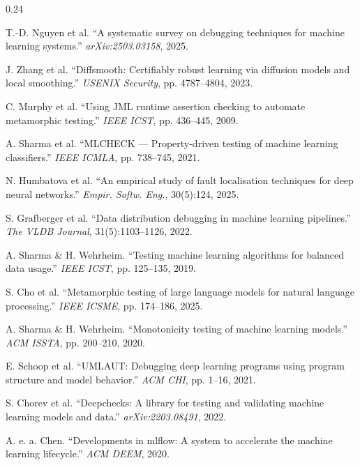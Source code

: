 \documentclass[final,t]{beamer}
\begin{document}
\begin{frame}[fragile]
\begin{columns}[T]
\begin{column}{0.24\textwidth}
\begin{posterblock}[References]
  \fontsize{15}{17.5}\selectfont\color{BodyText}
  \begin{enumerate}[leftmargin=8mm, itemsep=0.5mm, label={[\arabic*]}]
    \item T.-D. Nguyen et al. ``A systematic survey on debugging techniques for machine learning systems.'' \textit{arXiv:2503.03158}, 2025.
    \item J. Zhang et al. ``Diffsmooth: Certifiably robust learning via diffusion models and local smoothing.'' \textit{USENIX Security}, pp. 4787--4804, 2023.
    \item C. Murphy et al. ``Using JML runtime assertion checking to automate metamorphic testing.'' \textit{IEEE ICST}, pp. 436--445, 2009.
    \item A. Sharma et al. ``MLCHECK --- Property-driven testing of machine learning classifiers.'' \textit{IEEE ICMLA}, pp. 738--745, 2021.
    \item N. Humbatova et al. ``An empirical study of fault localisation techniques for deep neural networks.'' \textit{Empir. Softw. Eng.}, 30(5):124, 2025.
    \item S. Grafberger et al. ``Data distribution debugging in machine learning pipelines.'' \textit{The VLDB Journal}, 31(5):1103--1126, 2022.
    \item A. Sharma \& H. Wehrheim. ``Testing machine learning algorithms for balanced data usage.'' \textit{IEEE ICST}, pp. 125--135, 2019.
    \item S. Cho et al. ``Metamorphic testing of large language models for natural language processing.'' \textit{IEEE ICSME}, pp. 174--186, 2025.
    \item A. Sharma \& H. Wehrheim. ``Monotonicity testing of machine learning models.'' \textit{ACM ISSTA}, pp. 200--210, 2020.
    \item E. Schoop et al. ``UMLAUT: Debugging deep learning programs using program structure and model behavior.'' \textit{ACM CHI}, pp. 1--16, 2021.
    \item S. Chorev et al. ``Deepchecks: A library for testing and validating machine learning models and data.'' \textit{arXiv:2203.08491}, 2022.
    \item A. e. a. Chen. ``Developments in mlflow: A system to accelerate the machine learning lifecycle.'' \textit{ACM DEEM}, 2020.
  \end{enumerate}
\end{posterblock}


\end{column}
\end{columns}
\end{frame}
\end{document}
